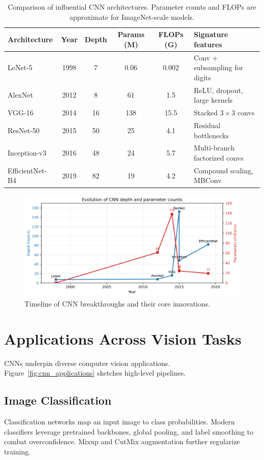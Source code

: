 ﻿\documentclass[12pt]{article}
\begin{document}
\begin{table}[H]
  \centering
  \caption{Comparison of influential CNN architectures. Parameter counts and FLOPs are approximate for ImageNet-scale models.}
  \label{tab:cnn_compare}
  \begin{tabular}{lccccl}
    \hline
    Architecture & Year & Depth & Params (M) & FLOPs (G) & Signature features \\
    \hline
    LeNet-5 & 1998 & 7 & 0.06 & 0.002 & Conv + subsampling for digits \\
    AlexNet & 2012 & 8 & 61 & 1.5 & ReLU, dropout, large kernels \\
    VGG-16 & 2014 & 16 & 138 & 15.5 & Stacked $3\times3$ convs \\
    ResNet-50 & 2015 & 50 & 25 & 4.1 & Residual bottlenecks \\
    Inception-v3 & 2016 & 48 & 24 & 5.7 & Multi-branch factorized convs \\
    EfficientNet-B4 & 2019 & 82 & 19 & 4.2 & Compound scaling, MBConv \\
    \hline
  \end{tabular}
\end{table}

\begin{figure}[H]
  \centering
  \includegraphics[width=0.85\linewidth]{cnn_architecture_evolution.png}
  \caption{Timeline of CNN breakthroughs and their core innovations.}
  \label{fig:cnn_timeline}
\end{figure}
\FloatBarrier

\section{Applications Across Vision Tasks}
CNNs underpin diverse computer vision applications. Figure~\ref{fig:cnn_applications} sketches high-level pipelines.

\subsection{Image Classification}
Classification networks map an input image to class probabilities. Modern classifiers leverage pretrained backbones, global pooling, and label smoothing to combat overconfidence. Mixup and CutMix augmentation further regularize training.
\end{document}
